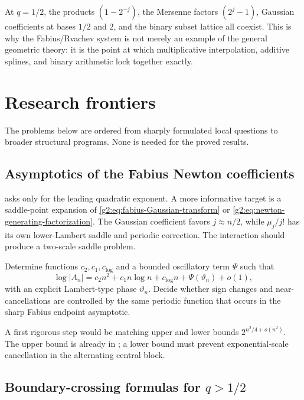 At $q=1/2$, the products $(1-2^{-j})$, the Mersenne factors $(2^j-1)$,
Gaussian coefficients at bases $1/2$ and $2$, and the binary subset lattice
all coexist.  This is why the Fabius/Rvachev system is not merely an example of
the general geometric theory: it is the point at which multiplicative
interpolation, additive splines, and binary arithmetic lock together exactly.


\section{Research frontiers}
\label{g2:sec:frontiers}

The problems below are ordered from sharply formulated local questions to
broader structural programs.  None is needed for the proved results.

\subsection{Asymptotics of the Fabius Newton coefficients}

 asks only for the leading quadratic exponent.  A
more informative target is a saddle-point expansion of
\eqref{g2:eq:fabius-Gaussian-transform} or
\eqref{g2:eq:newton-generating-factorization}.  The Gaussian coefficient favors
$j\approx n/2$, while $\mu_j/j!$ has its own lower-Lambert saddle and periodic
correction.  The interaction should produce a two-scale saddle problem.

\begin{problem}
\label{g2:prob:full-A-asymptotic}
Determine functions $c_2,c_1,c_{\log}$ and a bounded oscillatory term
$\Psi$ such that
\begin{equation}
 \log|A_n|
 =c_2n^2+c_1n\log n+c_{\log}n
 +\Psi(\vartheta_n)+o(1),
 \label{g2:eq:full-A-asymptotic}
\end{equation}
with an explicit Lambert-type phase $\vartheta_n$.  Decide whether sign
changes and near-cancellations are controlled by the same periodic function
that occurs in the sharp Fabius endpoint asymptotic.
\end{problem}

A first rigorous step would be matching upper and lower bounds
$2^{n^2/4+o(n^2)}$.  The upper bound is already in
; a lower bound must prevent exponential-scale
cancellation in the alternating central block.

\subsection{Boundary-crossing formulas for \texorpdfstring{$q>1/2$}{q greater than 1/2}}

